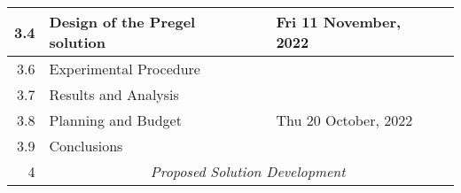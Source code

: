 \documentclass{standalone}
\begin{document}
\begin{tabular}{|r|llll|}
    3.4                                                       & \multicolumn{1}{l|}{Design of the Pregel solution}              & \multicolumn{1}{l|}{}                                          & \multicolumn{1}{l|}{Fri 11 November, 2022}                  &                                                              \\ \hline
    3.6                                                       & \multicolumn{1}{l|}{Experimental Procedure}                     & \multicolumn{1}{l|}{}                                          & \multicolumn{1}{l|}{}                                       &                                                              \\ \hline
    3.7                                                       & \multicolumn{1}{l|}{Results and Analysis}                       & \multicolumn{1}{l|}{}                                          & \multicolumn{1}{l|}{}                                       &                                                              \\ \hline
    3.8                                                       & \multicolumn{1}{l|}{Planning and Budget}                        & \multicolumn{1}{l|}{}                                          & \multicolumn{1}{l|}{Thu 20 October, 2022}                   &                                                              \\ \hline
    3.9                                                       & \multicolumn{1}{l|}{Conclusions}                                & \multicolumn{1}{l|}{}                                          & \multicolumn{1}{l|}{}                                       &                                                              \\ \hline
    4                                                         & \multicolumn{4}{c|}{\textit{Proposed Solution Development}}                                                                                                                                                                                                   \\ \hline
\end{tabular}
\end{document}
